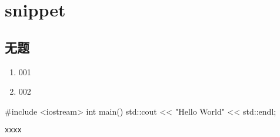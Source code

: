 \documentclass{../main.tex}{subfiles}
\begin{document}
\chapter{snippet}
\section{无题}
\begin{enumerate}[itemsep=0pt, parsep=0pt, topsep=0pt, partopsep=0pt]
  \item 001
  \item 002
\end{enumerate}

\begin{envCpp}[caption={xxx yyy}]
  #include <iostream>
  int main()
  {
    std::cout << "Hello World" << std::endl;
  }
\end{envCpp}

\begin{lstlisting}[style=lstCodeStylePlainText,title={测试}]
  xxxx
\end{lstlisting}

\end{document}

